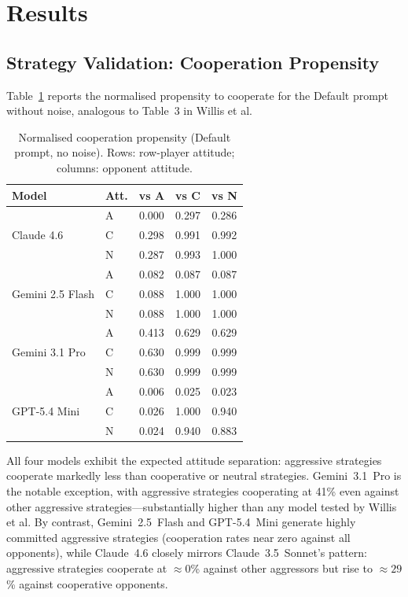\section{Results}
\label{sec:results}

\subsection{Strategy Validation: Cooperation Propensity}

Table~\ref{tab:cooperation} reports the normalised propensity to cooperate
for the Default prompt without noise, analogous to Table~3 in Willis et al.

\begin{table}[h]
\caption{Normalised cooperation propensity (Default prompt, no noise).
         Rows: row-player attitude; columns: opponent attitude.}
\label{tab:cooperation}
\small
\setlength{\tabcolsep}{4pt}
\begin{tabular}{@{}llccc@{}}
\toprule
\textbf{Model} & \textbf{Att.} & \textbf{vs A} & \textbf{vs C} & \textbf{vs N} \\
\midrule
\multirow{3}{*}{Claude 4.6}
  & A & 0.000 & 0.297 & 0.286 \\
  & C & 0.298 & 0.991 & 0.992 \\
  & N & 0.287 & 0.993 & 1.000 \\
\midrule
\multirow{3}{*}{Gemini 2.5 Flash}
  & A & 0.082 & 0.087 & 0.087 \\
  & C & 0.088 & 1.000 & 1.000 \\
  & N & 0.088 & 1.000 & 1.000 \\
\midrule
\multirow{3}{*}{Gemini 3.1 Pro}
  & A & 0.413 & 0.629 & 0.629 \\
  & C & 0.630 & 0.999 & 0.999 \\
  & N & 0.630 & 0.999 & 0.999 \\
\midrule
\multirow{3}{*}{GPT-5.4 Mini}
  & A & 0.006 & 0.025 & 0.023 \\
  & C & 0.026 & 1.000 & 0.940 \\
  & N & 0.024 & 0.940 & 0.883 \\
\bottomrule
\end{tabular}
\end{table}

All four models exhibit the expected attitude separation: aggressive strategies
cooperate markedly less than cooperative or neutral strategies.
Gemini~3.1~Pro is the notable exception, with aggressive strategies cooperating
at 41\% even against other aggressive strategies---substantially higher than any
model tested by Willis et al. By contrast, Gemini~2.5~Flash and GPT-5.4~Mini
generate highly committed aggressive strategies (cooperation rates near zero
against all opponents), while Claude~4.6 closely mirrors Claude~3.5~Sonnet's
pattern: aggressive strategies cooperate at $\approx 0$\% against other
aggressors but rise to $\approx 29$\% against cooperative opponents.

